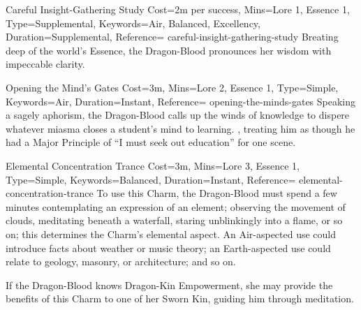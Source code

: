
\begin{Charm}{Careful Insight-Gathering Study}{%
    Cost=2m per success,
    Mins={Lore 1, Essence 1},
    Type=Supplemental,
    Keywords={Air, Balanced, Excellency},
    Duration=Supplemental,
    Reference=\cite*[p.~214]{db}
}{careful-insight-gathering-study}
    Breating deep of the world's Essence, the Dragon-Blood pronounces her
    wisdom with impeccable clarity. 
\end{Charm}


\begin{Charm}{Opening the Mind's Gates}{%
    Cost=3m,
    Mins={Lore 2, Essence 1},
    Type=Simple,
    Keywords=Air,
    Duration=Instant,
    Reference=\cite*[p~214]{db}
}{opening-the-minds-gates}
    Speaking a sagely aphorism, the Dragon-Blood calls up the winds of
    knowledge to dispere whatever miasma closes a student's mind to learning.
    ,
    treating him as though he had a Major Principle of ``I must seek out
    education'' for one scene. 
\end{Charm}


\begin{Charm}{Elemental Concentration Trance}{%
    Cost=3m,
    Mins={Lore 3, Essence 1},
    Type=Simple,
    Keywords=Balanced,
    Duration=Instant,
    Reference=\cite*[p.~214]{db}
}{elemental-concentration-trance}
    To use this Charm, the Dragon-Blood must spend a few minutes contemplating
    an expression of an element; observing the movement of clouds, meditating
    beneath a waterfall, staring unblinkingly into a flame, or so on; this
    determines the Charm's elemental aspect.  An Air-aspected use
    could introduce facts about weather or music theory; an Earth-aspected use
    could relate to geology, masonry, or architecture; and so on.

    \begin{Unavailable}
        If the Dragon-Blood knows Dragon-Kin Empowerment, she may provide the
        benefits of this Charm to one of her Sworn Kin, guiding him through
        meditation.
    \end{Unavailable}
\end{Charm}



